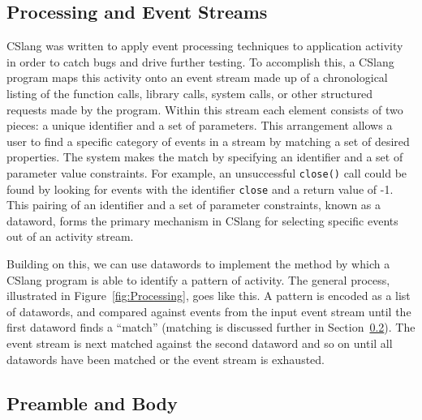 \subsection{Processing and Event Streams}
\label{sub:ProcessingEventStreams}
CSlang was written to
apply event processing
techniques to application activity 
in order to catch bugs and drive further
testing.
To accomplish this, a CSlang program maps this activity onto an
event stream
made up of a chronological listing of the function calls, library
calls, system calls, or other structured requests made by the program.
Within this stream each element consists of two pieces: a unique
identifier and a set of parameters.
This arrangement allows a user to find
a specific category of events
in a stream
by matching a set of desired properties.
The system makes the match by specifying
an identifier and a set of parameter value
constraints.  For example, an unsuccessful {\tt close()} call could be
found by looking for events with the identifier {\tt close} and a return
value of -1.  This pairing of an identifier and a set of parameter
constraints, known as a dataword, forms the primary mechanism in CSlang for
selecting specific events out of an activity stream.

Building on this, we can use datawords to implement the method by which
a CSlang program is able to
identify a  pattern of activity.
The general process, illustrated in Figure~\ref{fig:Processing}, goes like
this.  A pattern is encoded as a list of datawords, and compared against
events from the
input event stream until the first dataword
finds a ``match'' (matching is discussed further in
Section~\ref{sub:PreambleAndBody}).  The event stream is next matched
against the
second dataword
and so on until all datawords have been matched or the event stream is
exhausted.


%
%


\subsection{Preamble and Body}
\label{sub:PreambleAndBody}


